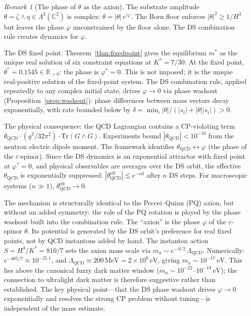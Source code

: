 \documentclass[11pt,a4paper]{article}
\theoremstyle{definition}
\theoremstyle{remark}
\newtheorem{remark}[theorem]{Remark}
\newcommand{\C}{\mathbb{C}}
\newcommand{\R}{\mathbb{R}}
\begin{document}
\begin{remark}[The phase of $\theta$ as the axion]\label{rem:strong_cp}
The substrate amplitude $\theta=\zeta\wedge\eta\in\Lambda^2(\C^2)$ is complex: $\theta=|\theta|\,e^{i\varphi}$. The Born floor enforces $|\theta|^2\geq 1/H^3$ but leaves the phase $\varphi$ unconstrained by the floor alone. The DS combination rule creates dynamics for $\varphi$.

The DS fixed point: Theorem~\ref{thm:fixedpoint} gives the equilibrium $m^*$ as the unique real solution of six constraint equations at $K^*=7/30$. At the fixed point, $\theta^*=0.1545\in\R_{>0}$: the phase is $\varphi^*=0$. This is not imposed; it is the unique real-positive solution of the fixed-point system. The DS combination rule, applied repeatedly to any complex initial state, drives $\varphi\to 0$ via phase washout (Proposition~\ref{prop:washout}): phase differences between mass vectors decay exponentially, with rate bounded below by $\delta=\min_i|\theta|/(|s_i|+|\theta||s_i|)>0$.

The physical consequence: the QCD Lagrangian contains a CP-violating term $\theta_\mathrm{QCD}\cdot(g^2/32\pi^2)\cdot\mathrm{Tr}(G\wedge G)$. Experiments bound $|\theta_\mathrm{QCD}|<10^{-10}$ from the neutron electric dipole moment. The framework identifies $\theta_\mathrm{QCD}\leftrightarrow\varphi$ (the phase of the $\varepsilon$-spinor). Since the DS dynamics is an exponential attractor with fixed point at $\varphi^*=0$, and physical observables are averages over the DS orbit, the effective $\theta_\mathrm{QCD}$ is exponentially suppressed: $|\theta_\mathrm{QCD}^\mathrm{eff}|\lesssim e^{-n\delta}$ after $n$ DS steps. For macroscopic systems ($n\gg 1$), $\theta_\mathrm{QCD}^\mathrm{eff}\to 0$.

The mechanism is structurally identical to the Peccei--Quinn (PQ) axion, but without an added symmetry: the role of the PQ rotation is played by the phase washout built into the combination rule. The ``axion'' is the phase $\varphi$ of the $\varepsilon$-spinor $\theta$. Its potential is generated by the DS orbit's preference for real fixed points, not by QCD instantons added by hand. The instanton action $S=H^3/K^*=810/7$ sets the axion mass scale via $m_a\sim e^{-S/2}\,\Lambda_\mathrm{QCD}$. Numerically: $e^{-405/7}\approx 10^{-25.1}$, and $\Lambda_\mathrm{QCD}\approx 200\,\mathrm{MeV}=2\times 10^8\,\mathrm{eV}$, giving $m_a\sim 10^{-17}\,\mathrm{eV}$. This lies above the canonical fuzzy dark matter window ($m_a\sim 10^{-22}$--$10^{-18}\,\mathrm{eV}$); the connection to ultralight dark matter is therefore suggestive rather than established. The key physical point---that the DS phase washout drives $\varphi\to 0$ exponentially and resolves the strong CP problem without tuning---is independent of the mass estimate.


\end{remark}
\end{document}
